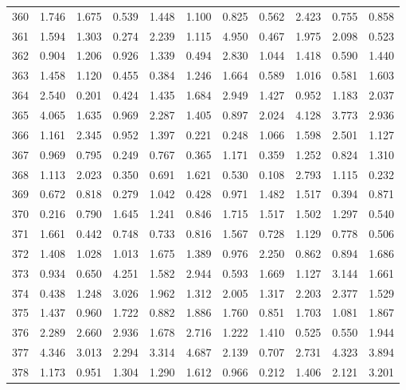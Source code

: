 \begin{tabular}{lrrrrrrrrrr}
360 &  1.746 &  1.675 &  0.539 &  1.448 &  1.100 &  0.825 &  0.562 &  2.423 &  0.755 &  0.858 \\
361 &  1.594 &  1.303 &  0.274 &  2.239 &  1.115 &  4.950 &  0.467 &  1.975 &  2.098 &  0.523 \\
362 &  0.904 &  1.206 &  0.926 &  1.339 &  0.494 &  2.830 &  1.044 &  1.418 &  0.590 &  1.440 \\
363 &  1.458 &  1.120 &  0.455 &  0.384 &  1.246 &  1.664 &  0.589 &  1.016 &  0.581 &  1.603 \\
364 &  2.540 &  0.201 &  0.424 &  1.435 &  1.684 &  2.949 &  1.427 &  0.952 &  1.183 &  2.037 \\
365 &  4.065 &  1.635 &  0.969 &  2.287 &  1.405 &  0.897 &  2.024 &  4.128 &  3.773 &  2.936 \\
366 &  1.161 &  2.345 &  0.952 &  1.397 &  0.221 &  0.248 &  1.066 &  1.598 &  2.501 &  1.127 \\
367 &  0.969 &  0.795 &  0.249 &  0.767 &  0.365 &  1.171 &  0.359 &  1.252 &  0.824 &  1.310 \\
368 &  1.113 &  2.023 &  0.350 &  0.691 &  1.621 &  0.530 &  0.108 &  2.793 &  1.115 &  0.232 \\
369 &  0.672 &  0.818 &  0.279 &  1.042 &  0.428 &  0.971 &  1.482 &  1.517 &  0.394 &  0.871 \\
370 &  0.216 &  0.790 &  1.645 &  1.241 &  0.846 &  1.715 &  1.517 &  1.502 &  1.297 &  0.540 \\
371 &  1.661 &  0.442 &  0.748 &  0.733 &  0.816 &  1.567 &  0.728 &  1.129 &  0.778 &  0.506 \\
372 &  1.408 &  1.028 &  1.013 &  1.675 &  1.389 &  0.976 &  2.250 &  0.862 &  0.894 &  1.686 \\
373 &  0.934 &  0.650 &  4.251 &  1.582 &  2.944 &  0.593 &  1.669 &  1.127 &  3.144 &  1.661 \\
374 &  0.438 &  1.248 &  3.026 &  1.962 &  1.312 &  2.005 &  1.317 &  2.203 &  2.377 &  1.529 \\
375 &  1.437 &  0.960 &  1.722 &  0.882 &  1.886 &  1.760 &  0.851 &  1.703 &  1.081 &  1.867 \\
376 &  2.289 &  2.660 &  2.936 &  1.678 &  2.716 &  1.222 &  1.410 &  0.525 &  0.550 &  1.944 \\
377 &  4.346 &  3.013 &  2.294 &  3.314 &  4.687 &  2.139 &  0.707 &  2.731 &  4.323 &  3.894 \\
378 &  1.173 &  0.951 &  1.304 &  1.290 &  1.612 &  0.966 &  0.212 &  1.406 &  2.121 &  3.201 \\

\end{tabular}
